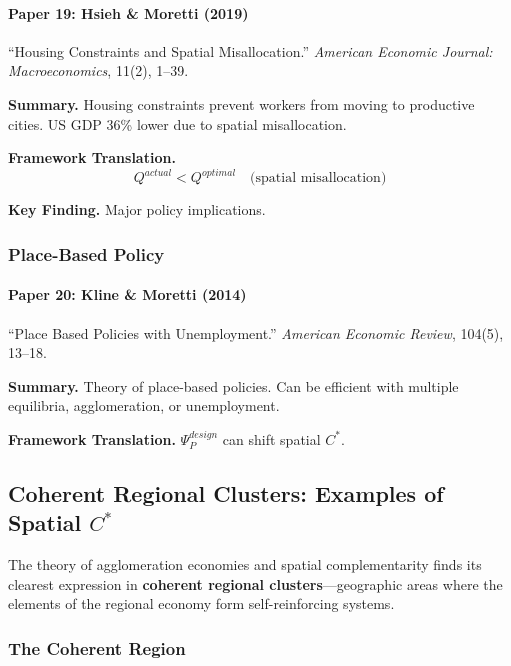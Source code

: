 \paragraph{Paper 19: Hsieh \& Moretti (2019)}

``Housing Constraints and Spatial Misallocation.''
\textit{American Economic Journal: Macroeconomics}, 11(2), 1--39.

\textbf{Summary.}
Housing constraints prevent workers from moving to productive cities.
US GDP 36\% lower due to spatial misallocation.

\textbf{Framework Translation.}
\begin{equation}
Q^{actual} < Q^{optimal} \quad \text{(spatial misallocation)}
\end{equation}

\textbf{Key Finding.}
Major policy implications.

\subsubsection{Place-Based Policy}

\paragraph{Paper 20: Kline \& Moretti (2014)}

``Place Based Policies with Unemployment.''
\textit{American Economic Review}, 104(5), 13--18.

\textbf{Summary.}
Theory of place-based policies. Can be efficient with multiple 
equilibria, agglomeration, or unemployment.

\textbf{Framework Translation.}
$\Psi_P^{design}$ can shift spatial $C^*$.

\subsection{Coherent Regional Clusters: Examples of Spatial $C^*$}
\label{sec:coherent-clusters}

The theory of agglomeration economies and spatial complementarity finds its
clearest expression in \textbf{coherent regional clusters}---geographic areas
where the elements of the regional economy form self-reinforcing systems.

\subsubsection{The Coherent Region}

